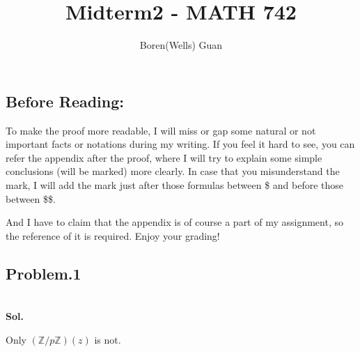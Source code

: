 \documentclass[lang=en,11pt,a4paper,citestyle =authoryear]{elegantpaper}
\title{Midterm2 - MATH 742}
\author{Boren(Wells) Guan}
\begin{document}
\maketitle

\subsection*{Before Reading:}\par
To make the proof more readable, I will miss or gap some natural or not important facts or notations during my writing. If you feel it hard to see, you can refer the appendix after the proof, where I will try to explain some simple conclusions (will be marked) more clearly. In case that you misunderstand the mark, I will add the mark just after those formulas between \$ and before those between \$\$.\par
And I have to claim that the appendix is of course a part of my assignment, so the reference of it is required. Enjoy your grading!

\subsection*{Problem.1}
\ \ \ 
\vspace{0.5em}\\
\textbf{Sol.} \par
Only $(\mathbb{Z}/p\mathbb{Z})(z)$ is not.
\par 
\vspace{0.5em}
\end{document}
